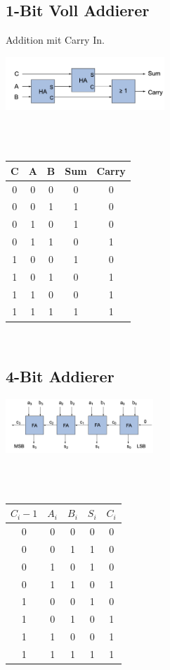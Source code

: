 \subsection{1-Bit Voll Addierer}
Addition mit Carry In. \\
\begin{minipage}{1\linewidth}
	\includegraphics[height=20mm]{images/1bitvoll.png}
\end{minipage}
\hfill
\\
\\
\begin{minipage}{1\linewidth}
	\begin{tabular}{| c | c | c || c| c |}
		\hline
		C & A & B & Sum & Carry \\
		\hline
		0 & 0 & 0 & 0 & 0 \\
		0 & 0 & 1 & 1 & 0 \\
		0 & 1 & 0 & 1 & 0 \\
		0 & 1 & 1 & 0 & 1 \\
		1 & 0 & 0 & 1 & 0 \\
		1 & 0 & 1 & 0 & 1 \\
		1 & 1 & 0 & 0 & 1 \\
		1 & 1 & 1 & 1 & 1 \\
		\hline
	\end{tabular} \\
\end{minipage}


\subsection{4-Bit Addierer}
\begin{minipage}{1\linewidth}
	\includegraphics[height=20mm]{images/4bitadd.png}
\end{minipage}
\hfill
\\
\\
\begin{minipage}{1\linewidth}
	\begin{tabular}{| c | c | c || c| c |}
		\hline
		$C_i-1$ & $A_i$ & $B_i$ & $S_i$ & $C_i$ \\
		\hline
		0 & 0 & 0 & 0 & 0 \\
		0 & 0 & 1 & 1 & 0 \\
		0 & 1 & 0 & 1 & 0 \\
		0 & 1 & 1 & 0 & 1 \\
		1 & 0 & 0 & 1 & 0 \\
		1 & 0 & 1 & 0 & 1 \\
		1 & 1 & 0 & 0 & 1 \\
		1 & 1 & 1 & 1 & 1 \\
		\hline
	\end{tabular} \\
\end{minipage}

